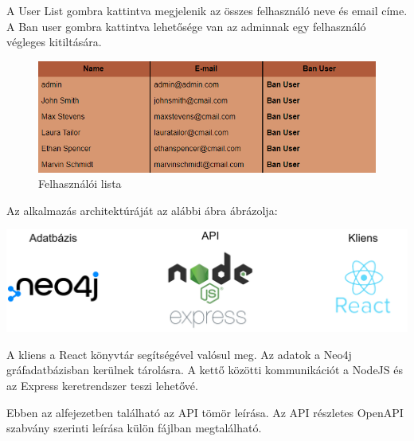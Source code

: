 A User List gombra kattintva megjelenik az összes felhasználó neve és email címe. A Ban user gombra kattintva lehetősége van az adminnak egy felhasználó végleges kitiltására.

\begin{figure}[H]
    \centering
    \includegraphics[scale=0.7]{images/application/userlist.png}
    \caption{Felhasználói lista}
\end{figure}


Az alkalmazás architektúráját az alábbi ábra ábrázolja:

\begin{center}
   \includegraphics[scale=0.3]{images/graphlibrary_architecture.png}
\end{center}

A kliens a React könyvtár segítségével valósul meg. Az adatok a Neo4j gráfadatbázisban kerülnek tárolásra. A kettő közötti kommunikációt a NodeJS és az Express keretrendszer teszi lehetővé.

Ebben az alfejezetben található az API tömör leírása. Az API részletes OpenAPI szabvány szerinti leírása külön fájlban megtalálható.

